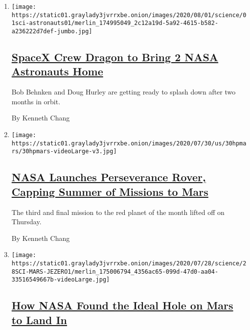 \begin{enumerate}
\def\labelenumi{\arabic{enumi}.}
\item
  \texttt{[image: https://static01.graylady3jvrrxbe.onion/images/2020/08/01/science/01sci-astronauts01/merlin\_174995049\_2c12a19d-5a92-4615-b582-a236222d7def-jumbo.jpg]}

  \hypertarget{spacex-crew-dragon-to-bring-2-nasa-astronauts-home}{%
  \subsection{\texorpdfstring{\href{/2020/08/01/science/nasa-spacex-astronauts.html}{SpaceX
  Crew Dragon to Bring 2 NASA Astronauts
  Home}}{SpaceX Crew Dragon to Bring 2 NASA Astronauts Home}}\label{spacex-crew-dragon-to-bring-2-nasa-astronauts-home}}

  Bob Behnken and Doug Hurley are getting ready to splash down after two
  months in orbit.

  By Kenneth Chang
\item
  \texttt{[image: https://static01.graylady3jvrrxbe.onion/images/2020/07/30/us/30hpmars/30hpmars-videoLarge-v3.jpg]}

  \hypertarget{nasa-launches-perseverance-rover-capping-summer-of-missions-to-mars}{%
  \subsection{\texorpdfstring{\href{/2020/07/30/science/nasa-mars-launch.html}{NASA
  Launches Perseverance Rover, Capping Summer of Missions to
  Mars}}{NASA Launches Perseverance Rover, Capping Summer of Missions to Mars}}\label{nasa-launches-perseverance-rover-capping-summer-of-missions-to-mars}}

  The third and final mission to the red planet of the month lifted off
  on Thursday.

  By Kenneth Chang
\item
  \texttt{[image: https://static01.graylady3jvrrxbe.onion/images/2020/07/28/science/28SCI-MARS-JEZERO1/merlin\_175006794\_4356ac65-099d-47d0-aa04-33516549667b-videoLarge.jpg]}

  \hypertarget{how-nasa-found-the-ideal-hole-on-mars-to-land-in}{%
  \subsection{\texorpdfstring{\href{/2020/07/28/science/nasa-jezero-perseverance.html}{How
  NASA Found the Ideal Hole on Mars to Land
  In}}{How NASA Found the Ideal Hole on Mars to Land In}}\label{how-nasa-found-the-ideal-hole-on-mars-to-land-in}}


\end{enumerate}
